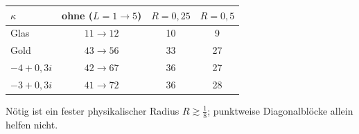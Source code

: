 \documentclass[11pt, a4paper]{article}
\begin{document}
\begin{center}\small
\begin{tabular}{lccc}
\toprule
$\kappa$ & ohne ($L=1\to5$) & $R=0{,}25$ & $R=0{,}5$\\
\midrule
Glas & $11\to12$ & 10 & 9\\
Gold & $43\to56$ & 33 & 27\\
$-4+0{,}3i$ & $42\to67$ & 36 & 27\\
$-3+0{,}3i$ & $41\to72$ & 36 & 28\\
\bottomrule
\end{tabular}
\end{center}
Nötig ist ein fester physikalischer Radius $R\gtrsim\tfrac18$; punktweise Diagonalblöcke
allein helfen nicht.

\end{document}
